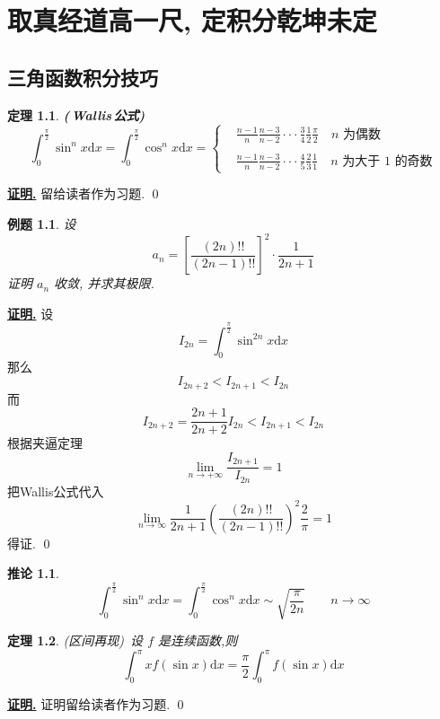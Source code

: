 \documentclass[10pt,a4paper]{book}
\theoremstyle{thmstyle} %
\newtheorem{theorem}{定理}[chapter]
\theoremstyle{defstyle} %
\newtheorem{corollary}{推论}[chapter]
\theoremstyle{prostyle} %
\newtheorem{example}{例题}[chapter]
\renewenvironment{proof}[1][证明]{\par{\kaishu \uline{\textbf{#1.}}} \;\fangsong}{\qed\par}
\begin{document}
	\chapter{取真经道高一尺, 定积分乾坤未定}
	\section{三角函数积分技巧}
	\begin{theorem}
		\textbf{(\,Wallis\,公式)}
		$$
		\int_0^{\frac{\pi}{2}}{\sin ^nx\mathrm{d}x=\int_0^{\frac{\pi}{2}}{\cos ^nx\mathrm{d}x}}=
		\left\{
			\begin{aligned}
			&\frac{n-1}{n}\frac{n-3}{n-2}\cdot\cdot\cdot\frac{3}{4}\frac{1}{2}\frac{\pi}{2}\quad\text{$n$ 为偶数}\\
			&\\
			&\frac{n-1}{n}\frac{n-3}{n-2}\cdot\cdot\cdot\frac{4}{5}\frac{2}{3}\frac{1}{1}\quad \text{$n$ 为大于 $1$ 的奇数}
		    \end{aligned}
			\right
			.
		$$
	\end{theorem}
	\begin{proof}
		留给读者作为习题.
	\end{proof}
	\begin{example}
		设
		$$
		a_n=\left[ \frac{\left( 2n \right) !!}{\left( 2n-1 \right) !!} \right] ^2\cdot \frac{1}{2n+1}
		$$
		证明 ${a_n}$ 收敛, 并求其极限.
	\end{example}
	\begin{proof}
		设
		$$
		I_{2n}=\int_0^{\frac{\pi}{2}}{\sin ^{2n}x}\mathrm{d}x
		$$
		那么
		$$
		I_{2n+2}<I_{2n+1}<I_{2n}
		$$
		而
		$$
		I_{2n+2}=\frac{2n+1}{2n+2}I_{2n}<I_{2n+1}<I_{2n}
		$$
		根据夹逼定理
		$$
		\lim\limits_{n\rightarrow +\infty}\frac{I_{2n+1}}{I_{2n}}=1
		$$
		把Wallis公式代入
		$$
		\lim _{n\rightarrow \infty}\frac{1}{2n+1}\left( \frac{\left( 2n \right) !!}{\left( 2n-1 \right) !!} \right) ^2\frac{2}{\pi}=1
		$$
		得证.
	\end{proof}
	\begin{corollary}
		$$
		\int_0^{\frac{\pi}{2}}{\sin ^nx\mathrm{d}x=\int_0^{\frac{\pi}{2}}{\cos ^nx\mathrm{d}x}}\sim\sqrt{\frac{\pi}{2n}}\quad\quad n\rightarrow\infty
		$$
	\end{corollary}
	\begin{theorem}
		(区间再现)\ 设 $f$ 是连续函数,则
		$$
		\int_0^{\pi}{xf\left( \sin x \right)}\mathrm{d}x=\frac{\pi}{2}\int_0^{\pi}{f\left( \sin x \right) \mathrm{d}x}
		$$
	\end{theorem}
	\begin{proof}
		证明留给读者作为习题.
	\end{proof}
\end{document}

